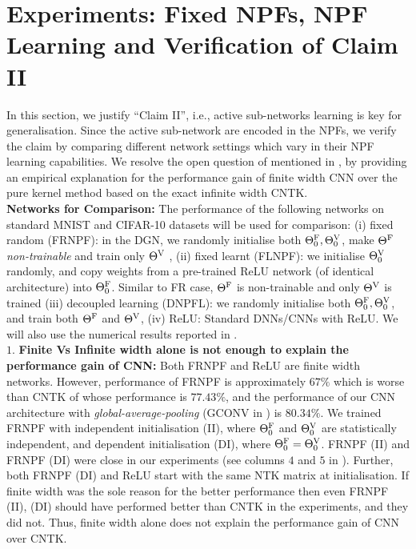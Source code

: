 \section{Experiments: Fixed NPFs, NPF Learning and Verification of Claim II}\label{sec:experiments} 
In this section, we justify ``Claim II'', i.e., active sub-networks learning is key for generalisation. Since the active sub-network are encoded in the NPFs, we verify the claim by comparing different network settings which vary in their NPF learning capabilities. We resolve the open question of \cite{arora2019exact} mentioned in , by providing an empirical explanation for the performance gain of finite width CNN over the pure kernel method based on the exact infinite width CNTK.\\
\textbf{Networks for Comparison:} The performance of the following networks on standard MNIST and CIFAR-10 datasets will be used for comparison: (i) fixed random (FRNPF): in the DGN, we randomly initialise both ${\Theta}^{\text{F}}_0,{\Theta}^{\text{V}}_0$, make ${\Theta}^{\text{F}}$ \emph{non-trainable} and train only ${\Theta}^{\text{V}}$ , (ii) fixed learnt (FLNPF): we initialise ${\Theta}^{\text{V}}_0$ randomly, and copy weights from a pre-trained ReLU network (of identical architecture) into ${\Theta}^{\text{F}}_0$. Similar to FR case, ${\Theta}^{\text{F}}$ is non-trainable and only ${\Theta}^{\text{V}}$ is trained (iii) decoupled learning (DNPFL):  we randomly initialise both ${\Theta}^{\text{F}}_0,{\Theta}^{\text{V}}_0$, and train both ${\Theta}^{\text{F}}$ and ${\Theta}^{\text{V}}$, (iv) ReLU: Standard DNNs/CNNs with ReLU.  We will also use the numerical results reported in \cite{arora2019exact}.\\
$1.$ \textbf{Finite Vs Infinite width alone is not enough to explain the performance gain of CNN:} Both FRNPF and ReLU are finite width networks. However, performance of FRNPF is  approximately $67\%$ which is worse than CNTK of \cite{arora2019exact} whose performance is $77.43\%$, and the performance of our CNN architecture with \emph{global-average-pooling} (GCONV in ) is $80.34\%$. We trained FRNPF with independent initialisation (II), where ${\Theta}^{\text{F}}_0$ and ${\Theta}^{\text{V}}_0$ are statistically independent, and dependent initialisation (DI), where ${\Theta}^{\text{F}}_0={\Theta}^{\text{V}}_0$. FRNPF (II) and FRNPF (DI) were close in our experiments (see columns $4$ and $5$ in ). Further, both FRNPF (DI) and ReLU start with the same NTK matrix at initialisation. If finite width was the sole reason for the better performance then even FRNPF (II), (DI) should have performed better than CNTK in the experiments, and they did not. Thus, finite width alone does not explain the performance gain of CNN over CNTK.\\
